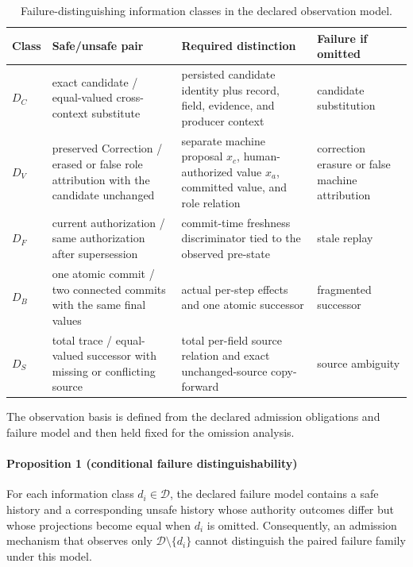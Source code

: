 \begin{table}[t]
\centering
\footnotesize
\caption{Failure-distinguishing information classes in the declared observation model.}
\label{tab:distinctions}
\begin{tabularx}{\textwidth}{@{}l>{\raggedright\arraybackslash}p{}>{\raggedright\arraybackslash}p{}>{\raggedright\arraybackslash}X@{}}
\toprule
Class & Safe/unsafe pair & Required distinction & Failure if omitted \\
\midrule
$D_C$ & exact candidate / equal-valued cross-context substitute & persisted candidate identity plus record, field, evidence, and producer context & candidate substitution \\
$D_V$ & preserved Correction / erased or false role attribution with the candidate unchanged & separate machine proposal $x_c$, human-authorized value $x_a$, committed value, and role relation & correction erasure or false machine attribution \\
$D_F$ & current authorization / same authorization after supersession & commit-time freshness discriminator tied to the observed pre-state & stale replay \\
$D_B$ & one atomic commit / two connected commits with the same final values & actual per-step effects and one atomic successor & fragmented successor \\
$D_S$ & total trace / equal-valued successor with missing or conflicting source & total per-field source relation and exact unchanged-source copy-forward & source ambiguity \\
\bottomrule
\end{tabularx}
\end{table}

The observation basis is defined from the declared admission obligations and failure model and then held fixed for the omission analysis.

\paragraph{Proposition 1 (conditional failure distinguishability)}
For each information class $d_i\in\mathcal D$, the declared failure model contains a safe history and a corresponding unsafe history whose authority outcomes differ but whose projections become equal when $d_i$ is omitted. Consequently, an admission mechanism that observes only $\mathcal D\setminus\{d_i\}$ cannot distinguish the paired failure family under this model.

